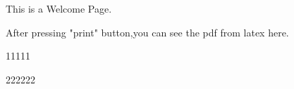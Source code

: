 \documentclass{article}
\begin{document}
This is a Welcome Page.
\par\par
After pressing "print" button,you can see the pdf from latex here.
\par
11111


222222
\end{document}
